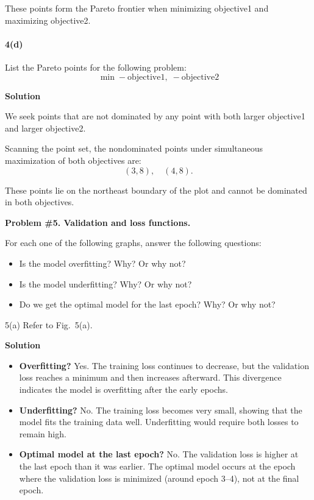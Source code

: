 \documentclass[11pt]{article}
\begin{document}
	These points form the Pareto frontier when minimizing objective1 and maximizing objective2.
	
	\paragraph{4(d)} List the Pareto points for the following problem:
	\[
	\min-\text{objective1},\; -\text{objective2} \tag{7}
	\]
	
	\noindent\textbf{Solution}
	
	We seek points that are not dominated by any point with both larger objective1 and larger objective2.
	
	Scanning the point set, the nondominated points under simultaneous maximization of both
	objectives are:
	\[
	(3,8),\quad (4,8).
	\]
	
	These points lie on the northeast boundary of the plot and cannot be dominated in both
	objectives.
	
	\newpage
	
	\noindent\textbf{Problem \#5. Validation and loss functions.}
	
	For each one of the following graphs, answer the following questions:
	
	\begin{itemize}
		\item Is the model overfitting? Why? Or why not?
		\item Is the model underfitting? Why? Or why not?
		\item Do we get the optimal model for the last epoch? Why? Or why not?
	\end{itemize}
	
	5(a) Refer to Fig.\ 5(a).
	
	\noindent\textbf{Solution}
	
	\begin{itemize}
		\item \textbf{Overfitting?}  
		Yes. The training loss continues to decrease, but the validation loss reaches a minimum and then increases afterward. This divergence indicates the model is overfitting after the early epochs.
		
		\item \textbf{Underfitting?}  
		No. The training loss becomes very small, showing that the model fits the training data well. Underfitting would require both losses to remain high.
		
		\item \textbf{Optimal model at the last epoch?}  
		No. The validation loss is higher at the last epoch than it was earlier. The optimal model occurs at the epoch where the validation loss is minimized (around epoch 3–4), not at the final epoch.
	\end{itemize}
	
\end{document}

